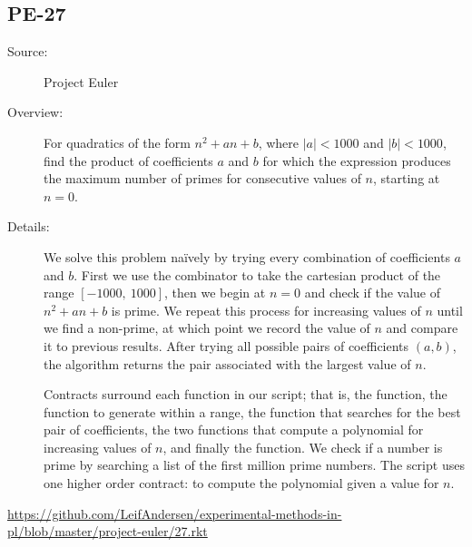 \subsection*{PE-27~\hrulefill}
\begin{description}
\item[Source:] Project Euler
\item[Overview:] For quadratics of the form $n^2 + an + b$, where $|a| < 1000$ and $|b| < 1000$, find the product of coefficients $a$ and $b$ for which the expression produces the maximum number of primes for consecutive values of $n$, starting at $n=0$.
\item[Details:] 
  We solve this problem na\"ively by trying every combination of coefficients $a$ and $b$.
  First we use the  combinator to take the cartesian product of the range $[-1000,~1000]$, then we begin at $n=0$ and check if the value of $n^2 + an + b$ is prime.
  We repeat this process for increasing values of $n$ until we find a non-prime, at which point we record the value of $n$ and compare it to previous results.
  After trying all possible pairs of coefficients $(a,b)$, the algorithm returns the pair associated with the largest value of $n$.

  Contracts surround each function in our script; that is, the  function, the function to generate  within a range, the function  that searches for the best pair of coefficients, the two functions that compute a polynomial for increasing values of $n$, and finally the  function.
  We check if a number is prime by searching a list of the first million prime numbers.
  The script uses one higher order contract: to compute the polynomial given a value for $n$.
\end{description}
\url{https://github.com/LeifAndersen/experimental-methods-in-pl/blob/master/project-euler/27.rkt}

